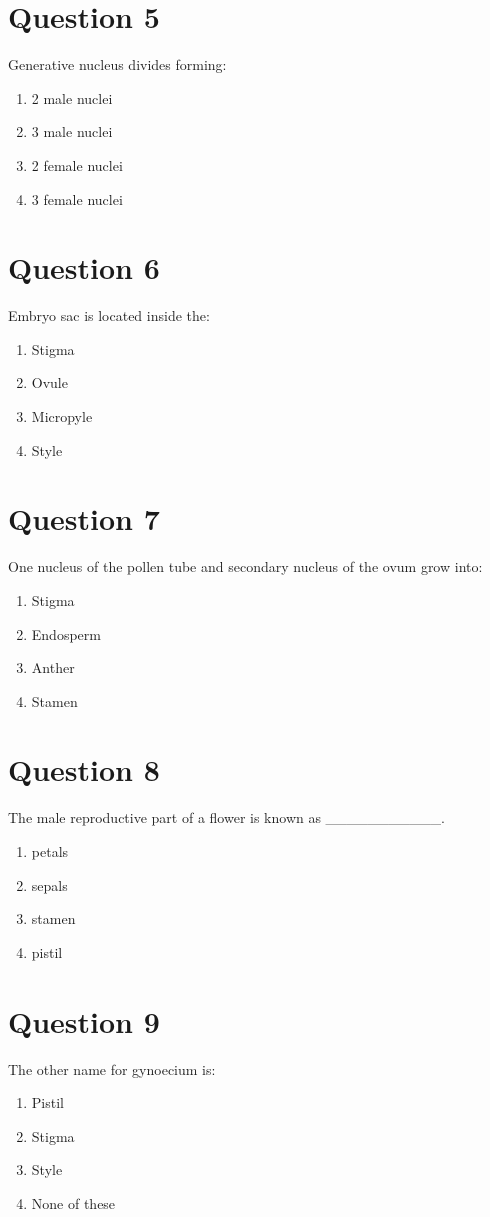 \documentclass{article}
\begin{document}
\section*{Question 5}
Generative nucleus divides forming:
\begin{enumerate}[label=(\alph*)]
\item 2 male nuclei
\item 3 male nuclei
\item 2 female nuclei
\item 3 female nuclei
\end{enumerate}
\newpage
\section*{Question 6}
Embryo sac is located inside the:
\begin{enumerate}[label=(\alph*)]
\item Stigma
\item Ovule
\item Micropyle
\item Style
\end{enumerate}
\newpage
\section*{Question 7}
One nucleus of the pollen tube and secondary nucleus of the ovum grow into:
\begin{enumerate}[label=(\alph*)]
\item Stigma
\item Endosperm
\item Anther
\item Stamen
\end{enumerate}
\newpage
\section*{Question 8}
The male reproductive part of a flower is known as ___________.
\begin{enumerate}[label=(\alph*)]
\item petals
\item sepals
\item stamen
\item pistil
\end{enumerate}
\newpage
\section*{Question 9}
The other name for gynoecium is:
\begin{enumerate}[label=(\alph*)]
\item Pistil
\item Stigma
\item Style\newline
\item None of these
\end{enumerate}
\newpage
\end{document}
